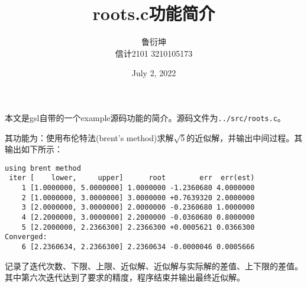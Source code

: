 \documentclass[UTF8]{article}
\title{roots.c功能简介}
\author{鲁衍坤 \\ 信计2101 3210105173}
\date{July 2, 2022}
\begin{document}
\maketitle

本文是gsl自带的一个example源码功能的简介。源码文件为\verb|../src/roots.c|。

其功能为：使用布伦特法(brent's method)求解$\sqrt{5}$的近似解，并输出中间过程。其输出如下所示：

\begin{verbatim}
using brent method
 iter [    lower,     upper]      root        err  err(est)
    1 [1.0000000, 5.0000000] 1.0000000 -1.2360680 4.0000000
    2 [1.0000000, 3.0000000] 3.0000000 +0.7639320 2.0000000
    3 [2.0000000, 3.0000000] 2.0000000 -0.2360680 1.0000000
    4 [2.2000000, 3.0000000] 2.2000000 -0.0360680 0.8000000
    5 [2.2000000, 2.2366300] 2.2366300 +0.0005621 0.0366300
Converged:
    6 [2.2360634, 2.2366300] 2.2360634 -0.0000046 0.0005666
\end{verbatim}

记录了迭代次数、下限、上限、近似解、近似解与实际解的差值、上下限的差值。
其中第六次迭代达到了要求的精度，程序结束并输出最终近似解。


\end{document}
